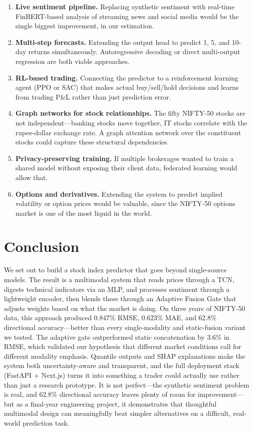 \documentclass[conference]{IEEEtran}
\begin{document}
\begin{enumerate}
\item \textbf{Live sentiment pipeline.} Replacing synthetic sentiment with real-time FinBERT-based analysis of streaming news and social media would be the single biggest improvement, in our estimation.
\item \textbf{Multi-step forecasts.} Extending the output head to predict 1, 5, and 10-day returns simultaneously. Autoregressive decoding or direct multi-output regression are both viable approaches.
\item \textbf{RL-based trading.} Connecting the predictor to a reinforcement learning agent (PPO or SAC) that makes actual buy/sell/hold decisions and learns from trading P\&L rather than just prediction error.
\item \textbf{Graph networks for stock relationships.} The fifty NIFTY-50 stocks are not independent---banking stocks move together, IT stocks correlate with the rupee-dollar exchange rate. A graph attention network over the constituent stocks could capture these structural dependencies.
\item \textbf{Privacy-preserving training.} If multiple brokerages wanted to train a shared model without exposing their client data, federated learning would allow that.
\item \textbf{Options and derivatives.} Extending the system to predict implied volatility or option prices would be valuable, since the NIFTY-50 options market is one of the most liquid in the world.
\end{enumerate}

\section{Conclusion}
We set out to build a stock index predictor that goes beyond single-source models. The result is a multimodal system that reads prices through a TCN, digests technical indicators via an MLP, and processes sentiment through a lightweight encoder, then blends these through an Adaptive Fusion Gate that adjusts weights based on what the market is doing. On three years of NIFTY-50 data, this approach produced 0.847\% RMSE, 0.623\% MAE, and 62.8\% directional accuracy---better than every single-modality and static-fusion variant we tested. The adaptive gate outperformed static concatenation by 3.6\% in RMSE, which validated our hypothesis that different market conditions call for different modality emphasis. Quantile outputs and SHAP explanations make the system both uncertainty-aware and transparent, and the full deployment stack (FastAPI + Next.js) turns it into something a trader could actually use rather than just a research prototype. It is not perfect---the synthetic sentiment problem is real, and 62.8\% directional accuracy leaves plenty of room for improvement---but as a final-year engineering project, it demonstrates that thoughtful multimodal design can meaningfully beat simpler alternatives on a difficult, real-world prediction task.
\end{document}
